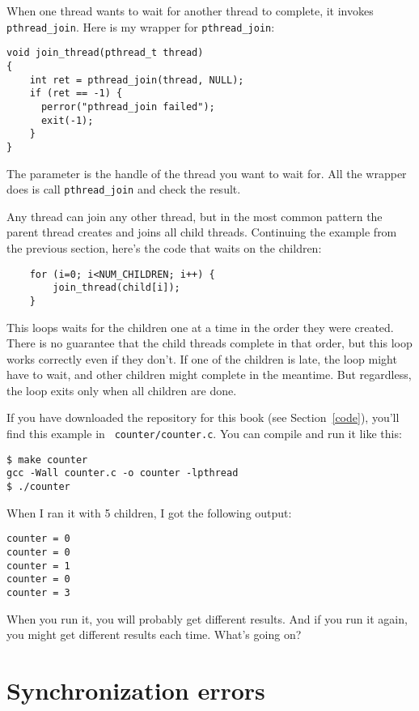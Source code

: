 \documentclass[12pt]{book}
\begin{document}
When one thread wants to wait for another thread to complete,
it invokes {\tt pthread\_join}.
Here is my wrapper for {\tt pthread\_join}:

\begin{verbatim}
void join_thread(pthread_t thread)
{
    int ret = pthread_join(thread, NULL);
    if (ret == -1) {
      perror("pthread_join failed");
      exit(-1);
    }
}
\end{verbatim}

The parameter is the handle of the thread you want to wait for.
All the wrapper does is call {\tt pthread\_join} and check the
result.

Any thread can join any other thread, but in the most common pattern
the parent thread creates and joins all child threads.
Continuing the example from the previous section, here's the
code that waits on the children:

\begin{verbatim}
    for (i=0; i<NUM_CHILDREN; i++) {
        join_thread(child[i]);
    }
\end{verbatim}

This loops waits for the children one at a time in the order they
were created.  There is no guarantee that the child threads complete 
in that order, but this loop works correctly even if they don't.  If one
of the children is late, the loop might have to wait, and other children
might complete in the meantime.  But regardless, the loop exits
only when all children are done.

If you have downloaded the repository for this book (see
Section~\ref{code}), you'll find this example in {\tt
  counter/counter.c}.  You can compile and run it like this:

\begin{verbatim}
$ make counter
gcc -Wall counter.c -o counter -lpthread
$ ./counter
\end{verbatim}

When I ran it with 5 children, I got the following output:

\begin{verbatim}
counter = 0
counter = 0
counter = 1
counter = 0
counter = 3
\end{verbatim}

When you run it, you will probably get different results.  And if
you run it again, you might get different results each time.  What's
going on?


\section{Synchronization errors}
\end{document}
